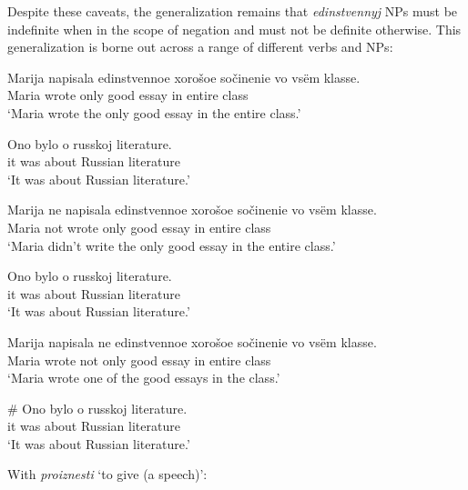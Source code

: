 
Despite these caveats, the generalization remains that \textit{edinstvennyj} NPs must be indefinite when in the scope of negation and must not be definite otherwise. This generalization is borne out across a range of different verbs and NPs:

\begin{exe}
	\ex \begin{xlist}
		\ex \gll Marija napisala edinstvennoe xoro\v{s}oe so\v{c}inenie vo vs\"{e}m klasse.\\
		Maria wrote only good essay in entire class\\
		\glt `Maria wrote the only good essay in the entire class.'

		\ex \gll Ono bylo o russkoj literature.\\
		it was about Russian literature\\
		\glt `It was about Russian literature.'
	\end{xlist}

	\ex \begin{xlist}
		\ex \gll Marija ne napisala edinstvennoe xoro\v{s}oe so\v{c}inenie vo vs\"{e}m klasse.\\
		Maria not wrote only good essay in entire class\\
		\glt `Maria didn't write the only good essay in the entire class.'

		\ex \gll Ono bylo o russkoj literature.\\
		it was about Russian literature\\
		\glt `It was about Russian literature.'
	\end{xlist}

	\ex \label{maria3} \begin{xlist}
		\ex \gll Marija napisala ne edinstvennoe xoro\v{s}oe so\v{c}inenie vo vs\"{e}m klasse.\\
		Maria wrote not only good essay in entire class\\
		\glt `Maria wrote one of the good essays in the class.'

		\ex \gll \# Ono bylo o russkoj literature.\\
		{} it was about Russian literature\\
		\glt `It was about Russian literature.'
	\end{xlist}
\end{exe}

With \textit{proiznesti} `to give (a speech)':

